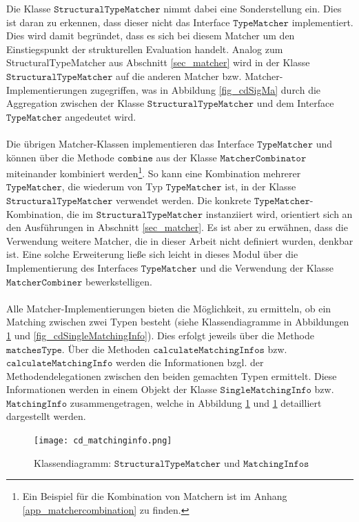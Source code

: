 \noindent
Die Klasse $\texttt{StructuralTypeMatcher}$ nimmt dabei eine Sonderstellung ein. Dies ist daran zu erkennen, dass dieser nicht das Interface $\texttt{TypeMatcher}$ implementiert. Dies wird damit begründet, dass es sich bei diesem Matcher um den Einstiegspunkt der strukturellen Evaluation handelt. Analog zum StructuralTypeMatcher aus Abschnitt \ref{sec_matcher} wird in der Klasse $\texttt{StructuralTypeMatcher}$ auf die anderen Matcher bzw. Matcher-Implementierungen zugegriffen, was in Abbildung \ref{fig_cdSigMa} durch die Aggregation zwischen der Klasse $\texttt{StructuralTypeMatcher}$ und dem Interface $\texttt{TypeMatcher}$ angedeutet wird.
\\\\
Die übrigen Matcher-Klassen implementieren das Interface $\texttt{TypeMatcher}$ und können über die Methode $\texttt{combine}$ aus der Klasse $\texttt{MatcherCombinator}$ miteinander kombiniert werden\footnote{Ein Beispiel für die Kombination von Matchern ist im Anhang \ref{app_matchercombination} zu finden.}. 
So kann eine Kombination mehrerer $\texttt{TypeMatcher}$, die wiederum von Typ $\texttt{TypeMatcher}$ ist, in der Klasse $\texttt{StructuralTypeMatcher}$ verwendet werden. Die konkrete $\texttt{TypeMatcher}$-Kombination, die im $\texttt{StructuralTypeMatcher}$ instanziiert wird, orientiert sich an den Ausführungen in Abschnitt \ref{sec_matcher}. Es ist aber zu erwähnen, dass die Verwendung weitere Matcher, die in dieser Arbeit nicht definiert wurden, denkbar ist. Eine solche Erweiterung ließe sich leicht in dieses Modul über die Implementierung des Interfaces $\texttt{TypeMatcher}$ und die Verwendung der Klasse $\texttt{MatcherCombiner}$ bewerkstelligen.
\\\\
Alle Matcher-Implementierungen bieten die Möglichkeit, zu ermitteln, ob ein Matching zwischen zwei Typen besteht (siehe Klassendiagramme in Abbildungen \ref{fig_cdMatchingInfo} und \ref{fig_cdSingleMatchingInfo}). Dies erfolgt jeweils über die Methode $\texttt{matchesType}$. Über die Methoden $\texttt{calculateMatchingInfos}$ bzw. $\texttt{calculateMatchingInfo}$ werden die Informationen bzgl. der Methodendelegationen zwischen den beiden gemachten Typen ermittelt. Diese Informationen werden in einem Objekt der Klasse $\texttt{SingleMatchingInfo}$ bzw. $\texttt{MatchingInfo}$ zusammengetragen, welche in Abbildung \ref{fig_cdMatchingInfo} und \ref{fig_cdMatchingInfo} detailliert dargestellt werden.
\begin{figure}[h!]
\texttt{[image: cd\_matchinginfo.png]}
\caption{Klassendiagramm: $\texttt{StructuralTypeMatcher}$ und $\texttt{MatchingInfos}$}
\label{fig_cdMatchingInfo}
\end{figure}
